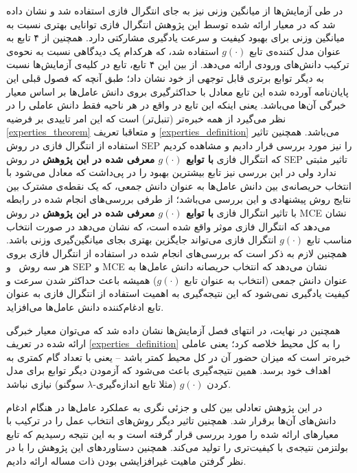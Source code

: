 در طی آزمایش‌ها از میانگین وزنی نیز به جای انتگرال فازی استفاده شد و نشان داده شد که در معیار ارائه شده توسط این پژوهش انتگرال فازی توانایی بهتری نسبت به میانگین وزنی برای بهبود کیفیت و سرعت یادگیری مشارکتی دارد. همچنین از ۴ تابع به عنوان مدل کننده‌ی تابع $g(\cdot)$ استفاده شد، که هرکدام یک دیدگاهی نسبت به نحوه‌ی ترکیب دانش‌های ورودی ارائه می‌دهد. از بین این ۴ تابع، تابع  در کلیه‌ی آزمایش‌ها نسبت به دیگر توابع برتری قابل توجهی از خود نشان داد؛ طبق آنچه که فصول قبلی این پایان‌نامه آورده شده این تابع معادل با حداکثرگیری بروی دانش عامل‌ها بر اساس معیار خبرگی آن‌ها می‌باشد. یعنی اینکه این تابع در واقع در هر ناحیه فقط دانش عاملی را در نظر می‌گیرد از همه خبره‌تر (تنبل‌تر) است که این امر تاییدی بر فرضیه
\ref{experties_theorem}
و متعاقبا تعریف
\ref{experties_definition}
می‌باشد. همچنین تاثیر استفاده از انتگرال فازی در روش SEP را نیز مورد بررسی قرار دادیم و مشاهده کردیم که انتگرال فازی \textbf{با توابع $g(\cdot)$ معرفی شده در این پژوهش} در روش SEP تاثیر مثبتی ندارد ولی در این بررسی نیز تابع  بیشترین بهبود را در پی‌داشت که معادل می‌شود با انتخاب حریصانه‌ی بین دانش عامل‌ها به عنوان دانش جمعی، که یک نقطه‌ی مشترک بین نتایج روش پیشنهادی و این بررسی می‌باشد؛ از طرفی بررسی‌های انجام شده در رابطه با تاثیر انتگرال فازی \textbf{با توابع $g(\cdot)$ معرفی شده در این پژوهش} در روش MCE نشان می‌دهد که انتگرال فازی موثر واقع شده است، که نشان می‌دهد در صورت انتخاب مناسب تابع $g(\cdot)$ انتگرال فازی می‌تواند جایگزین بهتری بجای میانگین‌گیری وزنی باشد. همچنین لازم به ذکر است که بررسی‌های انجام شده در استفاده از انتگرال فازی بروی هر سه روش \ و SEP و MCE نشان می‌دهد که انتخاب حریصانه دانش عامل‌ها به عنوان دانش جمعی (انتخاب  به عنوان تابع  $g(\cdot)$) همیشه باعث حداکثر شدن سرعت و کیفیت یادگیری نمی‌شود که این نتیجه‌گیری به اهمیت استفاده از انتگرال فازی به عنوان تابع ادغام‌کننده دانش‌ عامل‌ها می‌افزاید.

همچنین در نهایت، در انتهای فصل آزمایش‌ها نشان داده شد که می‌توان معیار خبرگی ارائه شده در تعریف
\ref{experties_definition}
را به کل محیط خلاصه کرد؛ یعنی عاملی خبره‌تر است که میزان حضور آن در کل محیط کمتر باشد -- یعنی با تعداد گام کمتری به اهداف خود برسد. همین نتیجه‌گیری باعث می‌شود که آزمودن دیگر توابع برای مدل کردن $g(\cdot)$ (مثلا تابع اندازه‌گیری-$\lambda$ سوگنو) نیازی نباشد.

در این پژوهش تعادلی بین کلی و جزئی نگری به عملکرد عامل‌ها در هنگام ادغام دانش‌های آن‌ها برقرار شد. همچنین تاثیر دیگر روش‌های انتخاب عمل را در ترکیب با معیار‌های ارائه شده را مورد بررسی قرار گرفته است و به این نتیجه رسیدیم که تابع بولتزمن نتیجه‌ی با کیفیت‌تری را تولید می‌کند. همچنین دستاورد‌های این پژوهش را با در نظر گرفتن ماهیت غیرافزایشی بودن ذات مساله ارائه دادیم.


